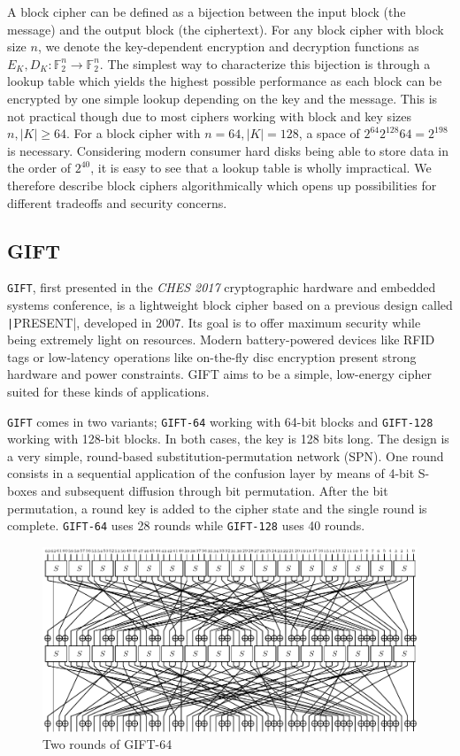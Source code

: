 \documentclass[12pt]{report}
\newcommand{\F}[1]{\mathbb{F}_2^{#1}}
\begin{document}
A block cipher can be defined as a bijection between the input block (the
message) and the output block (the ciphertext). For any block cipher with block
size $n$, we denote the key-dependent encryption and decryption functions as
$E_K,D_K:\F{n}\rightarrow \F{n}$. The simplest way to
characterize this bijection is through a lookup table which yields the highest
possible performance as each block can be encrypted by one simple lookup
depending on the key and the message. This is not practical though due to most
ciphers working with block and key sizes $n,|K|\geq 64$. For a block cipher
with $n=64,|K|=128$, a space of $2^{64}2^{128}64=2^{198}$ is necessary.
Considering modern consumer hard disks being able to store data in the order of
$2^{40}$, it is easy to see that a lookup table is wholly impractical. We
therefore describe block ciphers algorithmically which opens up possibilities
for different tradeoffs and security concerns.


\subsection{GIFT}

\texttt{GIFT}\cite{gift:2017}, first presented in the \textit{CHES 2017}
cryptographic hardware and embedded systems conference, is a lightweight block
cipher based on a previous design called \texttt|PRESENT|, developed in 2007. Its
goal is to offer maximum security while being extremely light on resources.
Modern battery-powered devices like RFID tags or low-latency operations like
on-the-fly disc encryption present strong hardware and power constraints. GIFT
aims to be a simple, low-energy cipher suited for these kinds of applications.

\texttt{GIFT} comes in two variants; \verb|GIFT-64| working with 64-bit blocks
and \texttt{GIFT-128} working with 128-bit blocks. In both cases, the key is 128
bits long. The design is a very simple, round-based substitution-permutation
network (SPN). One round consists in a sequential application of the confusion
layer by means of 4-bit S-boxes and subsequent diffusion through bit
permutation. After the bit permutation, a round key is added to the cipher
state and the single round is complete. \texttt{GIFT-64} uses 28 rounds while
\texttt{GIFT-128} uses 40 rounds.

\begin{figure}[h!]
    \centering
    \includegraphics[width=\textwidth]{Figures/GIFT-64.pdf}
    \caption{Two rounds of GIFT-64}
\end{figure}
\end{document}
